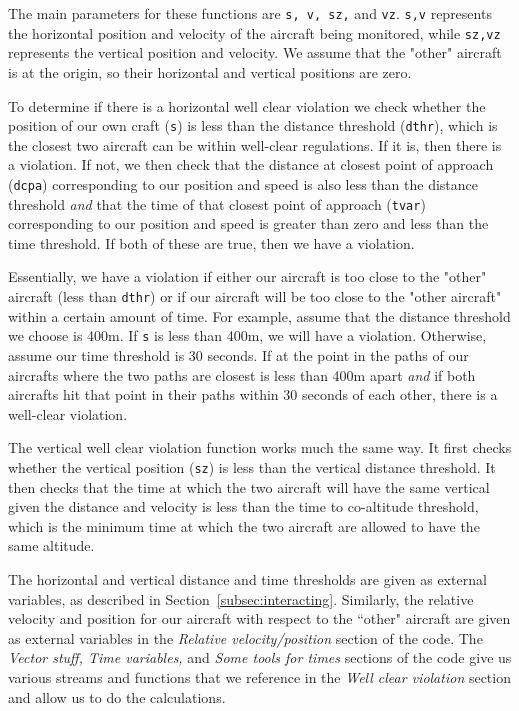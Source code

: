 The main parameters for these functions are {\tt s, v, sz,} and {\tt vz}. {\tt s,v} represents the horizontal position and velocity of the aircraft being monitored, while {\tt sz,vz} represents the vertical position and velocity. We assume that the "other" aircraft is at the origin, so their horizontal and vertical positions are zero. 

To determine if there is a horizontal well clear violation we check whether the position of our own craft ({\tt s}) is less than the distance threshold ({\tt dthr}), which is the closest two aircraft can be within well-clear regulations. If it is, then there is a violation. If not, we then check that the distance at closest point of approach ({\tt dcpa}) corresponding to our position and speed is also less than the distance threshold \emph{and} that the time of that closest point of approach ({\tt tvar}) corresponding to our position and speed is greater than zero and less than the time threshold. If both of these are true, then we have a violation. 

Essentially, we have a violation if either our aircraft is too close to the "other" aircraft (less than {\tt dthr}) or if our aircraft will be too close to the "other aircraft" within a certain amount of time. For example, assume that the distance threshold we choose is 400m. If {\tt s} is less than 400m, we will have a violation. Otherwise, assume our time threshold is 30 seconds. If at the point in the paths of our aircrafts where the two paths are closest is less than 400m apart \emph{and} if both aircrafts hit that point in their paths within 30 seconds of each other, there is a well-clear violation. 

The vertical well clear violation function works much the same way. It first checks whether the vertical position ({\tt sz}) is less than the vertical distance threshold. It then checks that the time at which the two aircraft will have the same vertical given the distance and velocity is less than the time to co-altitude threshold, which is the minimum time at which the two aircraft are allowed to have the same altitude. 

The horizontal and vertical distance and time thresholds are given as external variables, as described in Section~\ref{subsec:interacting}. Similarly, the relative velocity and position for our aircraft with respect to the ``other" aircraft are given as external variables in the \emph{Relative velocity/position} section of the code. The \emph{Vector stuff, Time variables,} and \emph{Some tools for times} sections of the code give us various streams and functions that we reference in the \emph{Well clear violation} section and allow us to do the calculations. 

